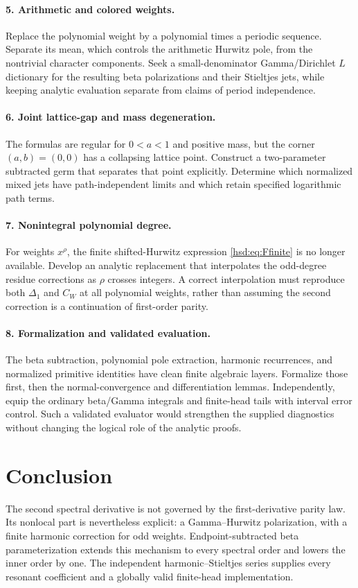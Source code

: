 \documentclass[11pt]{article}
\numberwithin{equation}{section}
\theoremstyle{definition}\newtheorem{definition}[theorem]{Definition}
\theoremstyle{remark}\newtheorem{remark}[theorem]{Remark}
\begin{document}
\paragraph{5. Arithmetic and colored weights.}
Replace the polynomial weight by a polynomial times a periodic sequence.
Separate its mean, which controls the arithmetic Hurwitz pole, from the
nontrivial character components. Seek a small-denominator Gamma/Dirichlet
$L$ dictionary for the resulting beta polarizations and their Stieltjes
jets, while keeping analytic evaluation separate from claims of period
independence.

\paragraph{6. Joint lattice-gap and mass degeneration.}
The formulas are regular for $0<a<1$ and positive mass, but the corner
$(a,b)=(0,0)$ has a collapsing lattice point. Construct a two-parameter
subtracted germ that separates that point explicitly. Determine which
normalized mixed jets have path-independent limits and which retain
specified logarithmic path terms.

\paragraph{7. Nonintegral polynomial degree.}
For weights $x^\rho$, the finite shifted-Hurwitz expression
\eqref{hsd:eq:Ffinite} is no longer available. Develop an analytic
replacement that interpolates the odd-degree residue corrections as
$\rho$ crosses integers. A correct interpolation must reproduce both
$\Delta_1$ and $C_W$ at all polynomial weights, rather than assuming the
second correction is a continuation of first-order parity.

\paragraph{8. Formalization and validated evaluation.}
The beta subtraction, polynomial pole extraction, harmonic recurrences,
and normalized primitive identities have clean finite algebraic layers.
Formalize those first, then the normal-convergence and differentiation
lemmas. Independently, equip the ordinary beta/Gamma integrals and
finite-head tails with interval error control. Such a validated evaluator
would strengthen the supplied diagnostics without changing the logical
role of the analytic proofs.

\section*{Conclusion}
The second spectral derivative is not governed by the first-derivative
parity law. Its nonlocal part is nevertheless explicit: a Gamma--Hurwitz
polarization, with a finite harmonic correction for odd weights.
Endpoint-subtracted beta parameterization extends this mechanism to
every spectral order and lowers the inner order by one. The independent
harmonic--Stieltjes series supplies every resonant coefficient and a
globally valid finite-head implementation.
\end{document}
